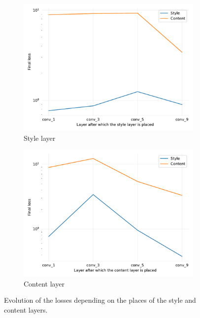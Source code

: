 \documentclass[twocolumn,superscriptaddress,aps,floatfix,nofootinbib]{revtex4-1}
\begin{document}
    \begin{figure}[ht]
        \centering
        \begin{subfigure}[b]{0.22\textwidth}
            \centering
            \includegraphics[width=\textwidth]{resources/png/layers/style_losses.pdf}
            \caption{Style layer}
            \label{fig:loss.layers.style}
        \end{subfigure}
        \hfill
        \begin{subfigure}[b]{0.22\textwidth}
            \centering
            \includegraphics[width=\textwidth]{resources/png/layers/content_losses.pdf}
            \caption{Content layer}
            \label{fig:loss.layers.content}
        \end{subfigure}
        \caption{Evolution of the losses depending on the places of the style and content layers.}
        \label{fig:loss.layers}
    \end{figure}
    
\end{document}

